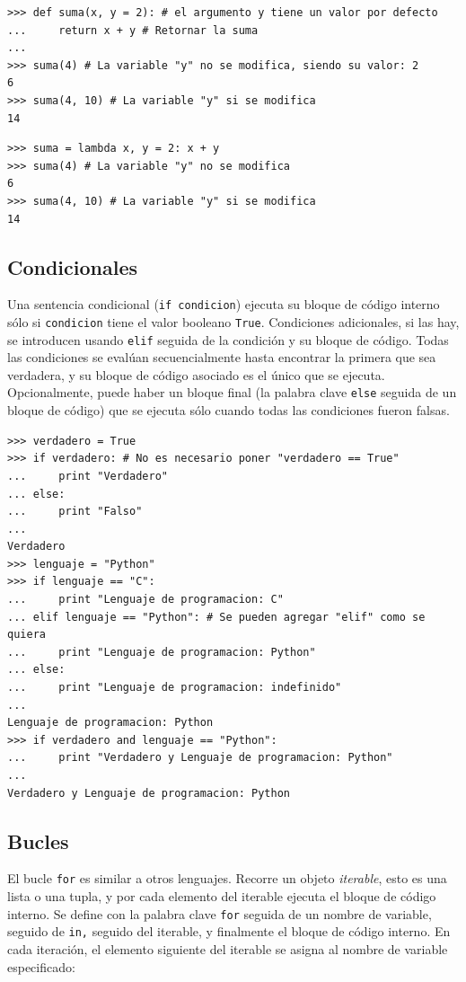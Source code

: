 \begin{lstlisting}
>>> def suma(x, y = 2): # el argumento y tiene un valor por defecto
...     return x + y # Retornar la suma
...
>>> suma(4) # La variable "y" no se modifica, siendo su valor: 2
6
>>> suma(4, 10) # La variable "y" si se modifica
14
\end{lstlisting}


\begin{lstlisting}
>>> suma = lambda x, y = 2: x + y
>>> suma(4) # La variable "y" no se modifica
6
>>> suma(4, 10) # La variable "y" si se modifica
14
\end{lstlisting}

\subsection{Condicionales}
 Una sentencia condicional (\verb~if condicion~) ejecuta su bloque de código interno 
 sólo si \verb~condicion~ tiene el valor booleano \verb~True~.  Condiciones adicionales, si las hay, se introducen usando \verb~elif~ seguida de la condición y su bloque de código. Todas las condiciones se evalúan secuencialmente hasta encontrar la primera que sea verdadera, y su bloque de código asociado es el único que se ejecuta. Opcionalmente, puede haber un bloque final (la palabra clave \verb~else~ seguida de un bloque de código) que se ejecuta sólo cuando todas las condiciones fueron falsas.



\begin{lstlisting}
>>> verdadero = True
>>> if verdadero: # No es necesario poner "verdadero == True"
...     print "Verdadero"
... else:
...     print "Falso"
...
Verdadero
>>> lenguaje = "Python"
>>> if lenguaje == "C": 
...     print "Lenguaje de programacion: C"
... elif lenguaje == "Python": # Se pueden agregar "elif" como se quiera
...     print "Lenguaje de programacion: Python"
... else: 
...     print "Lenguaje de programacion: indefinido"
...
Lenguaje de programacion: Python
>>> if verdadero and lenguaje == "Python": 
...     print "Verdadero y Lenguaje de programacion: Python"
...
Verdadero y Lenguaje de programacion: Python
\end{lstlisting}






\subsection{Bucles}
El bucle \verb~for~ es similar a  otros lenguajes. Recorre un objeto \emph{iterable},
esto es  una lista o una tupla, y por cada elemento del iterable 
ejecuta el bloque de código interno. 
Se define con la palabra clave \verb~for~ seguida de un nombre de variable, 
seguido de \verb~in,~ seguido del iterable, y finalmente el bloque de código interno. 
En cada iteración, el elemento siguiente del iterable se asigna al nombre de variable 
especificado:

